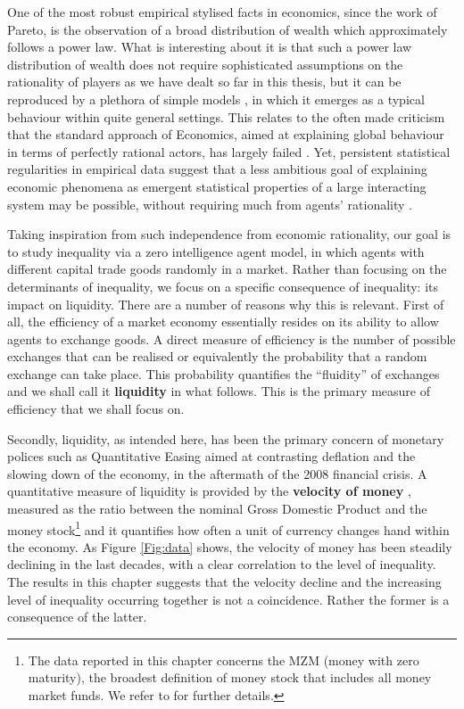 One of the most robust empirical stylised facts in economics, since the work of Pareto\cite{pareto}, is the observation of a broad distribution of wealth which approximately follows a power law.  What is interesting about it is that such a power law distribution of wealth does not require sophisticated assumptions on the rationality of players as we have dealt so far in this thesis, but it can be reproduced by a plethora of simple models \cite{albert2002, Bouchaud2000, Yakovenko2009Review,Gabaix2009,Sornette2013}, in which it emerges as a typical behaviour within quite general settings. This relates to the often made criticism that the standard approach of Economics, aimed at explaining global behaviour in terms of perfectly rational actors, has largely failed \cite{SMD30,BouchaudCrisis,KirmanBook}. Yet, persistent statistical regularities in empirical data suggest that a less ambitious goal of explaining economic phenomena as emergent statistical properties of a large interacting system may be possible, without requiring much from agents' rationality \cite{Gode1993,Smith2003}. 

Taking inspiration from such independence from economic rationality, our goal is to study inequality via a zero intelligence agent model, in which agents with different capital trade goods randomly in a market. Rather than focusing on the determinants of inequality, we focus on a specific consequence of inequality: its impact on liquidity. There are a number of reasons why this is relevant. First of all, the efficiency of a market economy essentially resides on its ability to allow agents to exchange goods. A direct measure of efficiency is the number of possible exchanges that can be realised or equivalently the probability that a random exchange can take place. This probability quantifies the ``fluidity'' of exchanges and we shall call it \textbf{liquidity} in what follows. This is the primary measure of efficiency that we shall focus on. 

Secondly, liquidity, as intended here, has been the primary concern of monetary polices such as Quantitative Easing aimed at contrasting deflation and the slowing down of the economy, in the aftermath of the 2008 financial crisis. A quantitative measure of liquidity is provided by the \textbf{velocity of money} \cite{IFisher}, measured as the ratio between the nominal Gross Domestic Product and the money stock\footnote{The data reported in this chapter concerns the MZM (money with zero maturity), the broadest definition of money stock that includes all money market funds. We refer to \cite{FRED} for further details.} and it quantifies how often a unit of currency changes hand within the economy. As Figure \ref{Fig:data} shows, the velocity of money has been steadily declining in the last decades, with a clear correlation to the level of inequality. The results in this chapter suggests that the velocity decline and the increasing level of inequality occurring together is not a coincidence. Rather the former is a consequence of the latter. 

